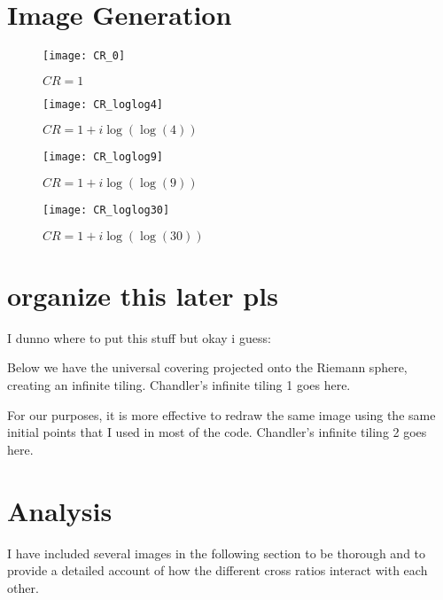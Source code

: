 \documentclass[12pt,a4paper,reqno,parskip=full]{amsart}
\numberwithin{equation}{section}
\theoremstyle{plain}
\theoremstyle{definition}
\begin{document}


\newpage
\section{Image Generation}

\begin{figure}[h]
    \centering
    \texttt{[image: CR\_0]}
    \caption{$CR=1$}
\end{figure}
\begin{figure}[h]
    \centering
    \texttt{[image: CR\_loglog4]}
    \caption{$CR=1+i\log(\log(4))$}
\end{figure}
\begin{figure}[h]
    \centering
    \texttt{[image: CR\_loglog9]}
    \caption{$CR=1+i\log(\log(9))$}
\end{figure}
\begin{figure}[h]
    \centering
    \texttt{[image: CR\_loglog30]}
    \caption{$CR=1+i\log(\log(30))$}
\end{figure}



\newpage
\section{organize this later pls}

I dunno where to put this stuff but okay i guess:

Below we have the universal covering projected onto the Riemann sphere, creating an infinite tiling.
Chandler's infinite tiling 1 goes here.

For our purposes, it is more effective to redraw the same image using the same initial points that I used in most of the code. 
Chandler's infinite tiling 2 goes here.

\newpage
\section{Analysis}
I have included several images in the following section to be thorough and to provide a detailed account of how the different cross ratios interact with each other. 
\end{document}
